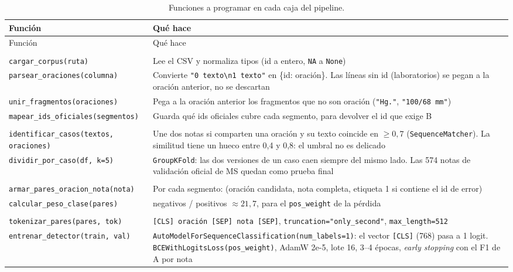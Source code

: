 \documentclass[11pt,a4paper]{article}
\newcommand{\fn}[1]{\texttt{\small #1}}
\begin{document}
{\small
\setlength{\tabcolsep}{4pt}
\begin{xltabular}{\textwidth}{>{\raggedright\arraybackslash}p{5.9cm} L}
\caption{Funciones a programar en cada caja del pipeline.}\label{tab:funciones} \\
\toprule
Función & Qué hace \\
\midrule
\endfirsthead
\toprule
Función & Qué hace \\
\midrule
\endhead
{} \\
\fn{cargar\_corpus(ruta)} & Lee el CSV y normaliza tipos (id a entero, \texttt{NA} a \texttt{None}) \\
\fn{parsear\_oraciones(columna)} & Convierte \texttt{"0 texto\textbackslash n1 texto"} en \{id: oración\}. Las líneas sin id (laboratorios) se pegan a la oración anterior, no se descartan \\
\fn{unir\_fragmentos(oraciones)} & Pega a la oración anterior los fragmentos que no son oración (\texttt{"Hg."}, \texttt{"100/68 mm"}) \\
\fn{mapear\_ids\_oficiales(segmentos)} & Guarda qué ids oficiales cubre cada segmento, para devolver el id que exige B \\
 \\
\fn{identificar\_casos(textos, oraciones)} & Une dos notas si comparten una oración y su texto coincide en $\ge 0{,}7$ (\fn{SequenceMatcher}). La similitud tiene un hueco entre 0,4 y 0,8: el umbral no es delicado \\
\fn{dividir\_por\_caso(df, k=5)} & \fn{GroupKFold}: las dos versiones de un caso caen siempre del mismo lado. Las 574 notas de validación oficial de MS quedan como prueba final \\
 \\
\fn{armar\_pares\_oracion\_nota(nota)} & Por cada segmento: (oración candidata, nota completa, etiqueta 1 si contiene el id de error) \\
\fn{calcular\_peso\_clase(pares)} & negativos / positivos $\approx 21{,}7$, para el \fn{pos\_weight} de la pérdida \\
 \\
\fn{tokenizar\_pares(pares, tok)} & \texttt{[CLS] oración [SEP] nota [SEP]}, \fn{truncation="only\_second"}, \fn{max\_length=512} \\
\fn{entrenar\_detector(train, val)} & \fn{AutoModelForSequenceClassification(num\_labels=1)}: el vector \texttt{[CLS]} (768) pasa a 1 logit. \fn{BCEWithLogitsLoss(pos\_weight)}, AdamW 2e-5, lote 16, 3--4 épocas, \emph{early stopping} con el F1 de A por nota \\

\end{xltabular}}
\end{document}
